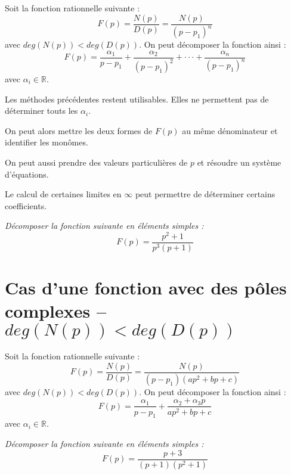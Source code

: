 \documentclass[11pt,oneside]{article}
\begin{document}
\begin{resultat}
Soit la fonction rationnelle suivante :
$$
F(p) = \dfrac{N(p)}{D(p)} =\dfrac{N(p)}{(p-p_1)^n}
$$
avec $deg(N(p)) < deg(D(p))$. On peut décomposer la fonction ainsi :
$$
F(p) = \dfrac{\alpha_1}{p-p_1} + \dfrac{\alpha_2}{\left(p-p_1\right)^2} 
+ \cdot \cdot \cdot + 
\dfrac{\alpha_n}{\left(p-p_1\right)^n} 
$$
avec $\alpha_i\in \mathbb{R}$.
\end{resultat}


\begin{methode}
Les méthodes précédentes restent utilisables. Elles ne permettent pas de déterminer touts les $\alpha_i$. 

On peut alors mettre les deux formes de $F(p)$ au même dénominateur et identifier les monômes. 

On peut aussi prendre des valeurs particulières de $p$ et résoudre un système d'équations.

Le calcul de certaines limites en $\infty$ peut permettre de déterminer certains coefficients. 
\end{methode}
\begin{exemple}
\textit{Décomposer la fonction suivante en éléments simples :}
$$
F(p)=\dfrac{p^2+1}{p^3(p+1)}
$$
\end{exemple}



\section{Cas d'une fonction avec des pôles complexes -- $deg(N(p)) < deg(D(p))$}

\begin{resultat}
Soit la fonction rationnelle suivante :
$$
F(p) = \dfrac{N(p)}{D(p)} =\dfrac{N(p)}{(p-p_1)(ap^2+bp+c)}
$$
avec $deg(N(p)) < deg(D(p))$. On peut décomposer la fonction ainsi :
$$
F(p) = \dfrac{\alpha_1}{p-p_1} + \dfrac{\alpha_2 + \alpha_3 p}{ap^2+bp+c} 
$$
avec $\alpha_i\in \mathbb{R}$.
\end{resultat}



\begin{exemple}
\textit{Décomposer la fonction suivante en éléments simples :}
$$
F(p)=\dfrac{p+3}{(p+1)(p^2+1)}
$$
\end{exemple}
\end{document}
